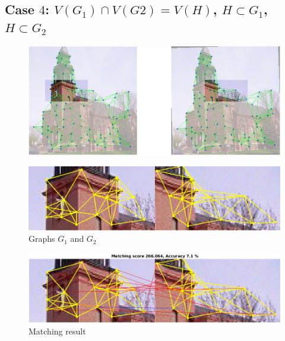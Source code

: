 \documentclass[
	fontsize=12pt,
	paper=a4,
	twoside=false,
	numbers=noenddot,
	plainheadsepline,
	toc=listof,
	toc=bibliography
]{scrartcl}
\begin{document}
\subsection*{ Case $4$: $V(G_1)\cap V(G2) = V(H)$, $H\subset G_1$, $H\subset G_2$}
\begin{figure} [htb] \centering
	\includegraphics[scale = 0.35]{test4/subregions.png}
\end{figure}
\begin{figure} [hb] \centering
	\includegraphics[scale = 0.4]{test4/subgraphs.png}
	\caption{Graphs $G_1$ and $G_2$}
\end{figure}
\begin{figure} [htb] \centering
	\includegraphics[scale = 0.4]{test4/matching_result.png}
	\caption{ Matching result}
\end{figure}

\FloatBarrier
\end{document}
